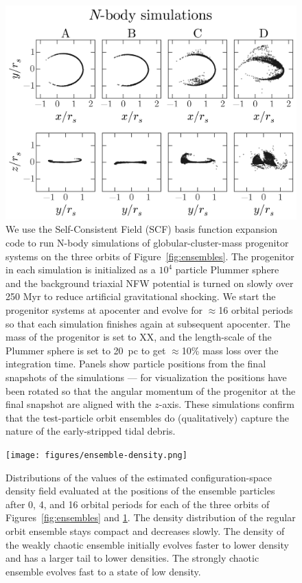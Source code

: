 \documentclass[letterpaper,12pt,preprint]{aastex}
\begin{document}
\begin{figure}[p]
\begin{center}
\includegraphics[width=\textwidth]{figures/nbody.png}
\caption{ We use the Self-Consistent Field (SCF) basis function expansion code \citep{hernquist92} to run N-body simulations of globular-cluster-mass progenitor systems on the three orbits of Figure~\ref{fig:ensembles}. The progenitor in each simulation is initialized as a $10^4$ particle Plummer sphere and the background triaxial NFW potential is turned on slowly over 250 Myr to reduce artificial gravitational shocking. We start the progenitor systems at apocenter and evolve for $\approx$16 orbital periods so that each simulation finishes again at subsequent apocenter. The mass of the progenitor is set to XX, and the length-scale of the Plummer sphere is set to 20~pc to get $\approx$10\% mass loss over the integration time. Panels show particle positions from the final snapshots of the simulations --- for visualization the positions have been rotated so that the angular momentum of the progenitor at the final snapshot are aligned with the $z$-axis. These simulations confirm that the test-particle orbit ensembles do (qualitatively) capture the nature of the early-stripped tidal debris. } 
\label{fig:nbodysims}
\end{center}
\end{figure}

\clearpage
\begin{figure}[p]
\begin{center}
\texttt{[image: figures/ensemble-density.png]}
\caption{ Distributions of the values of the estimated configuration-space density field evaluated at the positions of the ensemble particles after 0, 4, and 16 orbital periods for each of the three orbits of Figures~\ref{fig:ensembles} and \ref{fig:nbodysims}. The density distribution of the regular orbit ensemble stays compact and decreases slowly. The density of the weakly chaotic ensemble initially evolves faster to lower density and has a larger tail to lower densities. The strongly chaotic ensemble evolves fast to a state of low density.} \label{fig:ensemble-density}
\end{center}
\end{figure}
\end{document}
